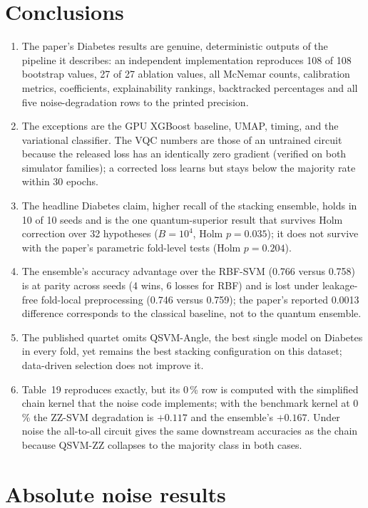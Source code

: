 \documentclass[11pt,a4paper]{article}
\newcommand{\tabdir}{../reimplementation/tex/}
\begin{document}
\section{Conclusions}
\begin{enumerate}[nosep]
  \item The paper's Diabetes results are genuine, deterministic outputs of the pipeline it describes: an independent implementation reproduces 108 of 108 bootstrap values, 27 of 27 ablation values, all McNemar counts, calibration metrics, coefficients, explainability rankings, backtracked percentages and all five noise-degradation rows to the printed precision.
  \item The exceptions are the GPU XGBoost baseline, UMAP, timing, and the variational classifier. The VQC numbers are those of an untrained circuit because the released loss has an identically zero gradient (verified on both simulator families); a corrected loss learns but stays below the majority rate within 30 epochs.
  \item The headline Diabetes claim, higher recall of the stacking ensemble, holds in 10 of 10 seeds and is the one quantum-superior result that survives Holm correction over 32 hypotheses ($B=10^4$, Holm $p=0.035$); it does not survive with the paper's parametric fold-level tests (Holm $p=0.204$).
  \item The ensemble's accuracy advantage over the RBF-SVM (0.766 versus 0.758) is at parity across seeds (4 wins, 6 losses for RBF) and is lost under leakage-free fold-local preprocessing (0.746 versus 0.759); the paper's reported 0.0013 difference corresponds to the classical baseline, not to the quantum ensemble.
  \item The published quartet omits QSVM-Angle, the best single model on Diabetes in every fold, yet remains the best stacking configuration on this dataset; data-driven selection does not improve it.
  \item Table~19 reproduces exactly, but its 0\,\% row is computed with the simplified chain kernel that the noise code implements; with the benchmark kernel at 0\,\% the ZZ-SVM degradation is $+0.117$ and the ensemble's $+0.167$. Under noise the all-to-all circuit gives the same downstream accuracies as the chain because QSVM-ZZ collapses to the majority class in both cases.
\end{enumerate}

\appendix
\section{Absolute noise results}
\label{app:noise}

\end{document}
